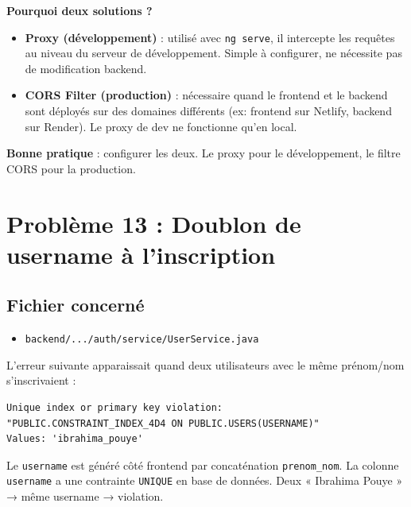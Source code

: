 \documentclass[a4paper,12pt,french]{article}
\begin{document}
\begin{lessonbox}
\textbf{Pourquoi deux solutions ?}

\begin{itemize}
    \item \textbf{Proxy (développement)} : utilisé avec \texttt{ng serve}, il intercepte les requêtes au niveau du serveur de développement. Simple à configurer, ne nécessite pas de modification backend.
    \item \textbf{CORS Filter (production)} : nécessaire quand le frontend et le backend sont déployés sur des domaines différents (ex: frontend sur Netlify, backend sur Render). Le proxy de dev ne fonctionne qu'en local.
\end{itemize}

\textbf{Bonne pratique} : configurer les deux. Le proxy pour le développement, le filtre CORS pour la production.
\end{lessonbox}

\newpage

\section{Problème 13 : Doublon de username à l'inscription}

\subsection{Fichier concerné}
\begin{itemize}
    \item \texttt{backend/.../auth/service/UserService.java}
\end{itemize}

\begin{problembox}
L'erreur suivante apparaissait quand deux utilisateurs avec le même prénom/nom s'inscrivaient :

\begin{lstlisting}[style=bashstyle]
Unique index or primary key violation:
"PUBLIC.CONSTRAINT_INDEX_4D4 ON PUBLIC.USERS(USERNAME)"
Values: 'ibrahima_pouye'
\end{lstlisting}

Le \texttt{username} est généré côté frontend par concaténation \texttt{prenom\_nom}. La colonne \texttt{username} a une contrainte \texttt{UNIQUE} en base de données. Deux « Ibrahima Pouye » → même username → violation.
\end{problembox}
\end{document}
